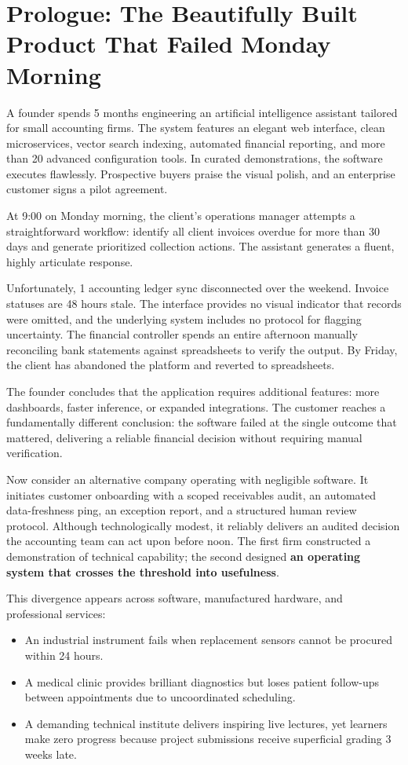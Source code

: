 \section*{Prologue: The Beautifully Built Product That Failed Monday Morning}

A founder spends 5 months engineering an artificial intelligence assistant tailored for small accounting firms. The system features an elegant web interface, clean microservices, vector search indexing, automated financial reporting, and more than 20 advanced configuration tools. In curated demonstrations, the software executes flawlessly. Prospective buyers praise the visual polish, and an enterprise customer signs a pilot agreement.

At 9:00 on Monday morning, the client's operations manager attempts a straightforward workflow: identify all client invoices overdue for more than 30 days and generate prioritized collection actions. The assistant generates a fluent, highly articulate response.

Unfortunately, 1 accounting ledger sync disconnected over the weekend. Invoice statuses are 48 hours stale. The interface provides no visual indicator that records were omitted, and the underlying system includes no protocol for flagging uncertainty. The financial controller spends an entire afternoon manually reconciling bank statements against spreadsheets to verify the output. By Friday, the client has abandoned the platform and reverted to spreadsheets.

The founder concludes that the application requires additional features: more dashboards, faster inference, or expanded integrations. The customer reaches a fundamentally different conclusion: the software failed at the single outcome that mattered, delivering a reliable financial decision without requiring manual verification.

Now consider an alternative company operating with negligible software. It initiates customer onboarding with a scoped receivables audit, an automated data-freshness ping, an exception report, and a structured human review protocol. Although technologically modest, it reliably delivers an audited decision the accounting team can act upon before noon. The first firm constructed a demonstration of technical capability; the second designed \textbf{an operating system that crosses the threshold into usefulness}.

This divergence appears across software, manufactured hardware, and professional services:
\begin{itemize}
    \item An industrial instrument fails when replacement sensors cannot be procured within 24 hours.
    \item A medical clinic provides brilliant diagnostics but loses patient follow-ups between appointments due to uncoordinated scheduling.
    \item A demanding technical institute delivers inspiring live lectures, yet learners make zero progress because project submissions receive superficial grading 3 weeks late.
\end{itemize}

